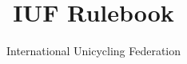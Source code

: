 \documentclass[a4paper,oneside,parskip=half]{scrbook}
\title{IUF Rulebook}
\author{International Unicycling Federation}
\date{\gitCommitterDate \\ \gitReferences \\ \gitHash}
\begin{document}
\maketitle
\doparttoc
\tableofcontents











\end{document}
